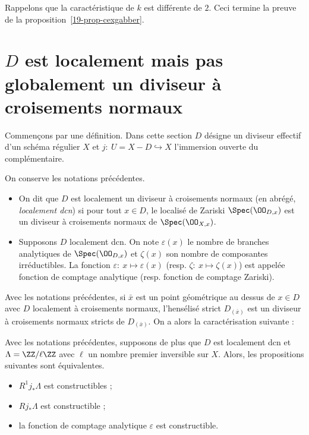 \documentclass[10pt]{../fichiers-configuration-latex/smfart}
\begin{document}
\medskip Rappelons que la caractéristique de $k$ est différente de $2$.  Ceci termine la preuve de
la proposition~\ref{19-prop-cexgabber}.

\section{$D$ est localement mais pas globalement un diviseur à croisements
normaux}\label{19-sec-dcn}

Commençons par une définition. Dans cette section $D$ désigne un diviseur effectif d'un schéma
régulier $X$ et $j:\ U=X-D\hookrightarrow X$ l'immersion ouverte du complémentaire.

\begin{definition} On conserve les notations précédentes.  \begin{itemize} \item On dit que $D$ est
localement un diviseur à croisements normaux (en abrégé, \emph{localement dcn}) si pour tout $x\in
D$, le localisé de Zariski $\Spec(\OO_{D,x})$ est un diviseur à croisements normaux de
$\Spec(\OO_{X,x})$.  \item Supposons $D$ localement dcn. On note $\varepsilon(x)$ le nombre de
branches analytiques de $\Spec(\OO_{D,x})$ et $\zeta(x)$ son nombre de composantes irréductibles. La
fonction $\varepsilon:\ x\mapsto\varepsilon(x)$ (resp. $\zeta:\ x\mapsto\zeta(x)$) est appelée
fonction de comptage analytique (resp. fonction de comptage Zariski).  \end{itemize}
\end{definition}

Avec les notations précédentes, si $\bar x$ est un point géométrique au dessus de $x\in D$ avec $D$
localement à croisements normaux, l'hensélisé strict $D_{(\bar x)}$ est un diviseur à croisements
normaux stricts de  $D_{(\bar x)}$. On a alors la caractérisation suivante :

\begin{lemme}\label{19-carac-fonction-dcn}  Avec les notations précédentes, supposons de plus que
$D$ est localement dcn et $\Lambda=\ZZ/\ell\ZZ$ avec $\ell$ un nombre premier inversible sur $X$.
Alors, les propositions suivantes sont équivalentes.  \begin{itemize} \item $R^1j_*\Lambda$ est
constructibles ; \item $Rj_*\Lambda$ est constructible ; \item la fonction de comptage analytique
$\varepsilon$ est constructible.  \end{itemize} \end{lemme}
\end{document}
